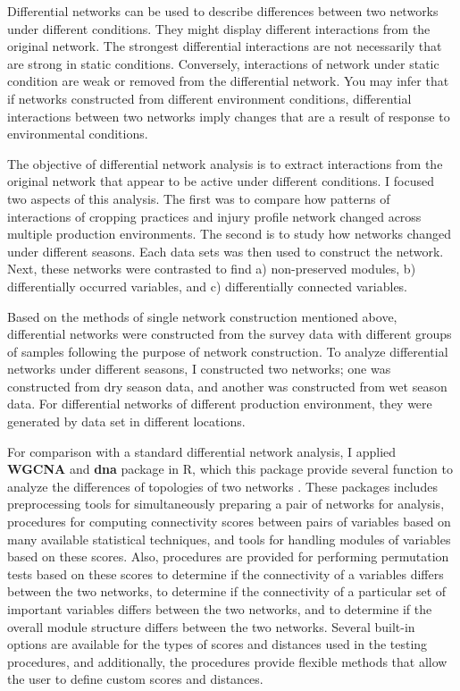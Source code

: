Differential networks can be used to describe differences between two networks under different conditions. They might display different interactions from the original network. The strongest differential interactions are not necessarily that are strong in static conditions. Conversely, interactions of network under static condition are weak or removed from the differential network. You may infer that if networks constructed from different environment conditions, differential interactions between two networks imply changes that are a result of response to environmental conditions. 

The objective of differential network analysis is to extract interactions from the original network that appear to be active under different conditions. I focused two aspects of this analysis. The first was to compare how patterns of interactions of cropping practices and injury profile network changed across multiple production environments. The second is to study how networks changed under different seasons. Each data sets was then used to construct the network. Next, these networks were contrasted to find a) non-preserved modules, b) differentially occurred variables, and c) differentially connected variables.

Based on the methods of single network construction mentioned above, differential networks were constructed from the survey data with different groups of samples following the purpose of network construction. To analyze differential networks under different seasons, I constructed two networks; one was constructed from dry season data, and another was constructed from wet season data. For differential networks of different production environment, they were generated by data set in different locations.

For comparison with a standard differential network analysis, I applied \textbf{WGCNA}  and \textbf{dna}  package in R, which this package provide several function to analyze the differences of topologies of two networks . 
These packages includes preprocessing tools for simultaneously preparing a pair of networks for analysis, procedures for computing connectivity scores between pairs of variables based on many available statistical techniques, and tools for handling modules of variables based on these scores. Also, procedures are provided for performing permutation tests based on these scores to determine if the connectivity of a variables differs between the two networks, to determine if the connectivity of a particular set of important variables differs between the two networks, and to determine if the overall module structure differs between the two networks. Several built-in options are available for the types of scores and distances used in the testing procedures, and additionally, the procedures provide flexible methods that allow the user to define custom scores and distances.

